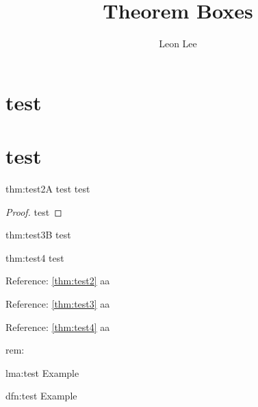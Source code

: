 \documentclass[]{article}
\title{Theorem Boxes}
\author{Leon Lee}
\begin{document}
\maketitle

\useseparatenumbers

\section{test}
\section{test}

\begin{thm}[Example]{thm:test2}{A}
    test
    \tcbline
    test
    \tcblower
    \begin{proof}
        test
    \end{proof}
\end{thm}

\begin{thm}[Example]{thm:test3}{B}
    test
\end{thm}

\begin{thm}[Example]{thm:test4}{}
    test
\end{thm}

%
%
%
%
%

Reference: \ref{thm:test2} aa

Reference: \ref{thm:test3} aa

Reference: \ref{thm:test4} aa



\begin{rem}[jkkj]{rem:}{}
    
\end{rem}
\begin{lma}[Example]{lma:test}{}
    Example
\end{lma}

\begin{dfn}[Example]{dfn:test}{}
    Example
\end{dfn}
\end{document}
